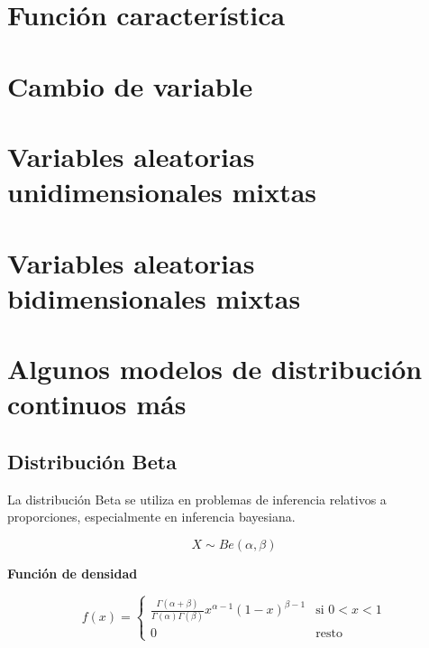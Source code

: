 \documentclass[
]{book}
\begin{document}
\hypertarget{funciuxf3n-caracteruxedstica}{%
\section{Función característica}\label{funciuxf3n-caracteruxedstica}}

\hypertarget{cambio-de-variable}{%
\section{Cambio de variable}\label{cambio-de-variable}}

\hypertarget{variables-aleatorias-unidimensionales-mixtas}{%
\section{Variables aleatorias unidimensionales mixtas}\label{variables-aleatorias-unidimensionales-mixtas}}

\hypertarget{variables-aleatorias-bidimensionales-mixtas}{%
\section{Variables aleatorias bidimensionales mixtas}\label{variables-aleatorias-bidimensionales-mixtas}}

\hypertarget{algunos-modelos-de-distribuciuxf3n-continuos-muxe1s}{%
\section{Algunos modelos de distribución continuos más}\label{algunos-modelos-de-distribuciuxf3n-continuos-muxe1s}}

\hypertarget{distribuciuxf3n-beta}{%
\subsection{Distribución Beta}\label{distribuciuxf3n-beta}}

La distribución Beta se utiliza en problemas de inferencia relativos a proporciones, especialmente en inferencia bayesiana.

\[X \sim \mathit{Be}(\alpha, \beta)\]

\textbf{Función de densidad}

\[f(x) = 
\begin{cases}
\frac{\Gamma(\alpha + \beta)}{\Gamma(\alpha)\Gamma(\beta)}x^{\alpha-1}(1-x)^{\beta -1} & \text{si } 0 < x < 1\\
0 & \text{resto } 
\end{cases}\]
\end{document}
